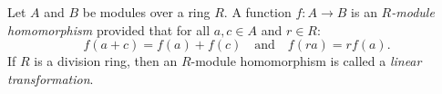 Let $A$ and $B$ be modules over a ring $R$. A function $f : A \to B$ is an \emph{$R$-module homomorphism} provided that for all $a, c \in A$ and $r \in R$:
\[
f(a + c) = f(a) + f(c) \quad \text{and} \quad f(ra) = rf(a).
\]
If $R$ is a division ring, then an $R$-module homomorphism is called a \emph{linear transformation}.
